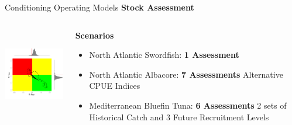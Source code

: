 \documentclass{beamer}
\newcommand\Fontviii{\fontsize{8}{10}\selectfont}
\begin{document}
\begin{frame}{Conditioning Operating Models}
  \smallskip\textbf{Stock Assessment}\smallskip\\
  \begin{columns}[t] %
   \begin{column}[T]{5cm} %
    \includegraphics[height=40mm]{kobePlot-swon.png}
   \end{column}
   \begin{column}[T]{6cm} %
   \Fontviii
   \textbf{Scenarios}
   \begin{itemize}%
       \item {\color{blue} North Atlantic Swordfish:} \textbf{1 Assessment}
       \item {\color{blue} North Atlantic Albacore:} \textbf{7 Assessments} Alternative CPUE Indices
       \item {\color{blue} Mediterranean Bluefin Tuna:} \textbf{6 Assessments} 2 sets of Historical Catch and 3 Future Recruitment Levels 
   \end{itemize}
   \end{column}
\end{columns}
\end{frame}
\end{document}
